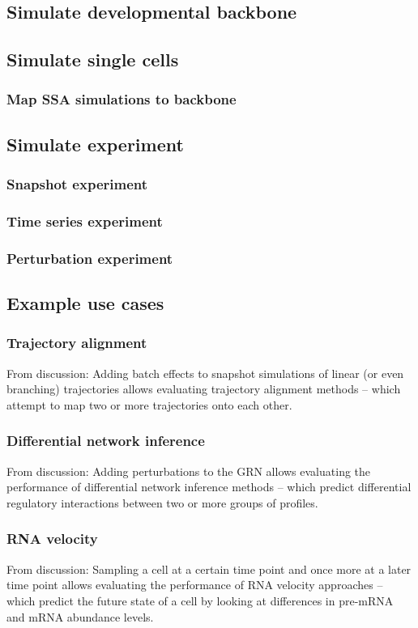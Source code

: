 \subsection{Simulate developmental backbone}

\subsection{Simulate single cells}
\subsubsection{Map SSA simulations to backbone}

\subsection{Simulate experiment}
\subsubsection{Snapshot experiment}
\subsubsection{Time series experiment}
\subsubsection{Perturbation experiment}

\subsection{Example use cases}
\subsubsection{Trajectory alignment}
From discussion: Adding batch effects to snapshot simulations of linear (or even branching) trajectories allows evaluating trajectory alignment methods -- which attempt to map two or more trajectories onto each other. 
\subsubsection{Differential network inference}
From discussion: Adding perturbations to the GRN allows evaluating the performance of differential network inference methods -- which predict differential regulatory interactions between two or more groups of profiles.
\subsubsection{RNA velocity}
From discussion: Sampling a cell at a certain time point and once more at a later time point allows evaluating the performance of RNA velocity approaches -- which predict the future state of a cell by looking at differences in pre-mRNA and mRNA abundance levels.







